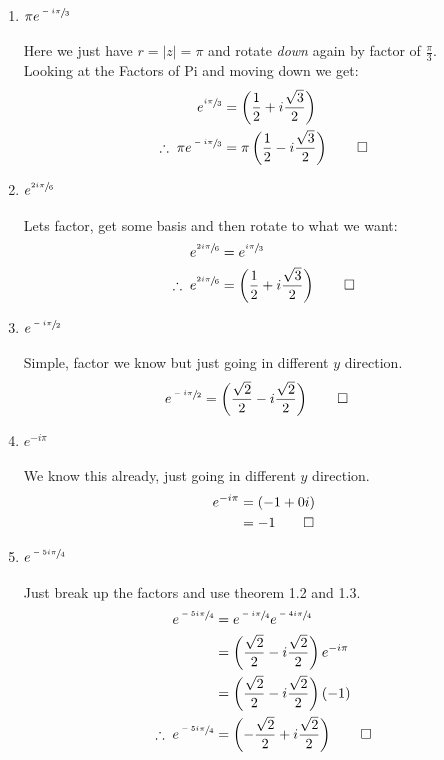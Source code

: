 \begin{enumerate}
\begin{enumerate}
		\item $\pi e^{\sfrac{-i\pi}{3}}$ \\
		\\
		Here we just have $ r = |z| = \pi$ and rotate \textit{down} again by factor of $\frac{\pi}{3}.$ \\

		Looking at the Factors of Pi and moving down we get:
		\begin{align*}
			e^{\sfrac{i\pi}{3}} &= \left( \frac{1}{2} + i\frac{\sqrt{3}}{2} \right) \\
			\therefore \; \pi e^{\sfrac{-i\pi}{3}} &= \pi \left( \frac{1}{2} - i\frac{\sqrt{3}}{2} \right) \qed \\
		\end{align*}


		\item $e^{\sfrac{2i\pi}{6}}$ \\
		\\
		Lets factor, get some basis and then rotate to what we want:
		\begin{align*}
			e^{\sfrac{2i\pi}{6}} &= e^{\sfrac{i\pi}{3}} \\
			\therefore \; e^{\sfrac{2i\pi}{6}} &= \left( \frac{1}{2} + i\frac{\sqrt{3}}{2} \right) \qed \\  
		\end{align*}


		\item $e^{\sfrac{-i\pi}{2}}$ \\
		\\
		Simple, factor we know but just going in different $y$ direction.
		\begin{align*}
			e^{\sfrac{-i\pi}{2}} &= \left( \frac{\sqrt{2}}{2} - i\frac{\sqrt{2}}{2} \right) \qed
		\end{align*}


		\item $e^{-i\pi}$ \\
		\\
		We know this already, just going in different $y$ direction.
		\begin{align*}
			e^{-i\pi} &= \left( -1 + 0i \right) \\
			&= -1 \qed
		\end{align*}


		\item $e^{\sfrac{-5i\pi}{4}}$ \\
		\\
		Just break up the factors and use theorem 1.2 and 1.3.
		\begin{align*}
			e^{\sfrac{-5i\pi}{4}} &= e^{\sfrac{-i\pi}{4}} e^{\sfrac{-4i\pi}{4}} \\
			&= \left( \frac{\sqrt{2}}{2} - i\frac{\sqrt{2}}{2} \right) e^{-i\pi} \\
			&= \left( \frac{\sqrt{2}}{2} - i\frac{\sqrt{2}}{2} \right) (-1) \\
			\therefore \; e^{\sfrac{-5i\pi}{4}} &= \left( -\frac{\sqrt{2}}{2} + i\frac{\sqrt{2}}{2} \right) \qed \\
		\end{align*}
	\end{enumerate}
	


\end{enumerate}

